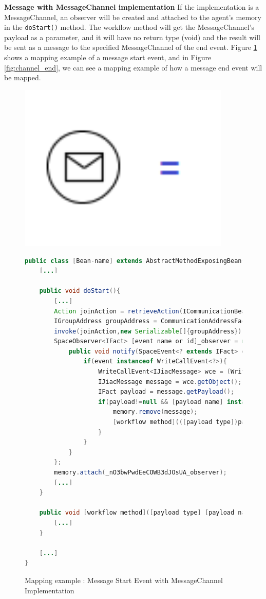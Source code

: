 \newpage
\textbf{Message with MessageChannel implementation}
If the implementation is a MessageChannel, an observer will be created and attached to the agent's memory in the \verb|doStart()| method.
The workflow method will get the MessageChannel's payload as a parameter, and it will have no return type (void) and the result will be sent as a message to the specified MessageChannel of the end event. Figure \ref{fig:channel_start} shows a mapping example of a message start event, and in Figure \ref{fig:channel_end}, we can see a mapping example of how a message end event will be mapped.
\begin{figure}[h]
\begin{minipage}[c]{0.28\textwidth}
\includegraphics[width=0.9\textwidth]{images/mapping/message_start.png}
\end{minipage}
\begin{minipage}[c]{0.72\textwidth}
\begin{lstlisting}[language = Java]
public class [Bean-name] extends AbstractMethodExposingBean{
	[...]
	
	public void doStart(){
		[...]
		Action joinAction = retrieveAction(ICommunicationBean.ACTION_JOIN_GROUP);
		IGroupAddress groupAddress = CommunicationAddressFactory.createGroupAddress([channel]);
		invoke(joinAction,new Serializable[]{groupAddress});
		SpaceObserver<IFact> [event name or id]_observer = new SpaceObserver<IFact>(){
			public void notify(SpaceEvent<? extends IFact> event) { 
				if(event instanceof WriteCallEvent<?>){ 
					WriteCallEvent<IJiacMessage> wce = (WriteCallEvent<IJiacMessage>) event;
					IJiacMessage message = wce.getObject();
					IFact payload = message.getPayload();
					if(payload!=null && [payload name] instanceof [payload type]&& message.getHeader(IJiacMessage.Header.SEND_TO).equals([channel]){
						memory.remove(message);
						[workflow method](([payload type])payload);
					}
				}
			}
		};
		memory.attach(_nO3bwPwdEeCOWB3dJOsUA_observer);
		[...]
	}
	
	public void [workflow method]([payload type] [payload name]){
		[...]
	}
	
	[...]
}
\end{lstlisting}
\end{minipage}
\caption{Mapping example : Message Start Event with MessageChannel Implementation}%
\label{fig:channel_start}
\end{figure}


